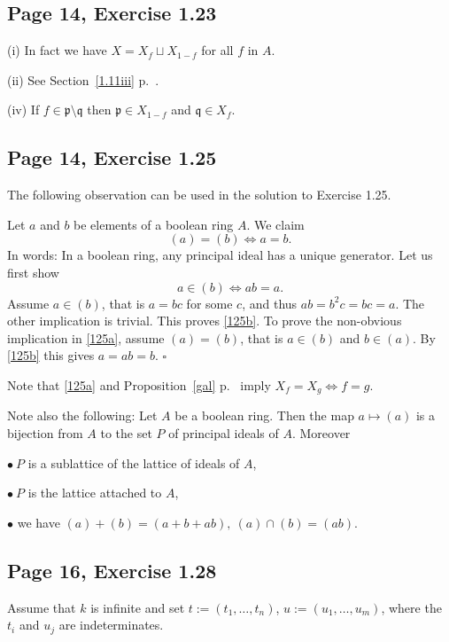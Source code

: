 \documentclass[parskip=half,fontsize=12pt]{scrartcl}%
\newcommand{\mf}{\mathfrak}
\newcommand{\ppp}{\mf p}
\newcommand{\qqq}{\mf q}
\begin{document}
\subsection{Page 14, Exercise 1.23}%

(i) In fact we have $X=X_f\sqcup X_{1-f}$ for all $f$ in $A$.

(ii) See Section~\ref{1.11iii} p.~\pageref{1.11iii}.

(iv) If $f\in\ppp\setminus\qqq$ then $\ppp\in X_{1-f}$ and $\qqq\in X_f$.

\subsection{Page 14, Exercise 1.25}%

The following observation can be used in the solution to Exercise 1.25.

Let $a$ and $b$ be elements of a boolean ring $A$. We claim
\begin{equation}\label{125a}
(a)=(b)\iff a=b.
\end{equation} 
In words: In a boolean ring, any principal ideal has a unique generator. Let us first show 
\begin{equation}\label{125b}
a\in(b)\iff ab=a.
\end{equation}
Assume $a\in(b)$, that is $a=bc$ for some $c$, and thus $ab=b^2c=bc=a$. The other implication is trivial. This proves \eqref{125b}. To prove the non-obvious implication in \eqref{125a}, assume $(a)=(b)$, that is $a\in(b)$ and $b\in(a)$. By \eqref{125b} this gives $a=ab=b$. $\square$

Note that \eqref{125a} and Proposition~\ref{gal} p.~\pageref{gal} imply $X_f=X_g\iff f=g$.

Note also the following: Let $A$ be a boolean ring. Then the map $a\mapsto(a)$ is a bijection from $A$ to the set $P$ of principal ideals of $A$. Moreover 

$\bullet\ P$ is a sublattice of the lattice of ideals of $A$, 

$\bullet\  P$ is the lattice attached to $A$,

$\bullet$ we have $(a)+(b)=(a+b+ab),\ (a)\cap(b)=(ab)$. 

\subsection{Page 16, Exercise 1.28}%

Assume that $k$ is infinite and set $t:=(t_1,\dots,t_n)$, $u:=(u_1,\dots,u_m)$, where the $t_i$ and $u_j$ are indeterminates. 
\end{document}
